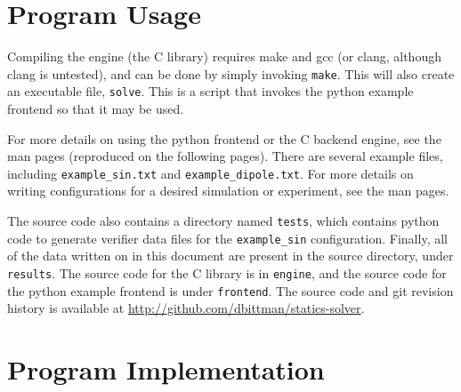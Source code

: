 \documentclass[12pt]{article}
\begin{document}
\clearpage
\begin{appendices}
\section{Program Usage}

Compiling the engine (the C library) requires make and gcc (or clang, although clang is untested), and can
be done by simply invoking \texttt{make}. This will also create an executable file, \texttt{solve}. This
is a script that invokes the python example frontend so that it may be used.

For more details on using the python frontend or the C backend engine, see the man pages (reproduced on the
following pages). There are several example files, including \texttt{example\_sin.txt} and \texttt{example\_dipole.txt}.
For more details on writing configurations for a desired simulation or experiment, see the man pages.

The source code also contains a directory named \texttt{tests}, which contains python code to generate verifier data
files for the \texttt{example\_sin} configuration. Finally, all of the data written on in this document are present
in the source directory, under \texttt{results}. The source code for the C library is in \texttt{engine}, and the
source code for the python example frontend is under \texttt{frontend}. The source code and git revision history
is available at \url{http://github.com/dbittman/statics-solver}.

%
%
\clearpage



\section{Program Implementation}
\label{app:des}

\end{appendices}

\clearpage



\end{document}
